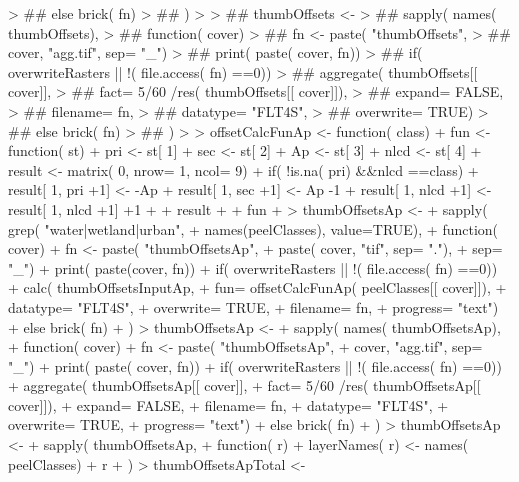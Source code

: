 \begin{Schunk}
\begin{Sinput}
{> ##            else brick( fn)
> ##          })
> 
> ## thumbOffsets <-
> ##   sapply( names( thumbOffsets),
> ##          function( cover) {
> ##            fn <- paste( "thumbOffsets",
> ##                        cover, "agg.tif", sep= "_")
> ##            print( paste( cover, fn))
> ##            if( overwriteRasters || !( file.access( fn) ==0))
> ##              aggregate( thumbOffsets[[ cover]],
> ##                        fact= 5/60 /res( thumbOffsets[[ cover]]),
> ##                        expand= FALSE,
> ##                        filename= fn,
> ##                        datatype= "FLT4S",
> ##                        overwrite= TRUE)
> ##            else brick( fn)
> ##          })
> 
> offsetCalcFunAp <- function( class) {
+   fun <- function( st) {
+     pri <- st[ 1]
+     sec <- st[ 2]
+     Ap <- st[ 3]
+     nlcd <- st[ 4]
+     result <- matrix( 0, nrow= 1, ncol= 9)
+     if( !is.na( pri) &&nlcd ==class) {
+       result[ 1, pri +1] <- -Ap
+       result[ 1, sec +1] <- Ap -1
+       result[ 1, nlcd +1] <- result[ 1, nlcd +1] +1
+     }
+     result
+   }
+   fun
+ }
> thumbOffsetsAp <-
+   sapply( grep( "water|wetland|urban",
+                names(peelClasses), value=TRUE),
+          function( cover) {
+            fn <- paste( "thumbOffsetsAp",
+                   paste( cover, "tif", sep= "."),
+                   sep= "_")
+            print( paste(cover, fn))
+            if( overwriteRasters || !( file.access( fn) ==0)) {
+              calc( thumbOffsetsInputAp,
+                   fun= offsetCalcFunAp( peelClasses[[ cover]]),
+                   datatype= "FLT4S",
+                   overwrite= TRUE,
+                   filename= fn,
+                   progress= "text")
+            } else brick( fn)
+          })
> thumbOffsetsAp <-
+   sapply( names( thumbOffsetsAp),
+          function( cover) {
+            fn <- paste( "thumbOffsetsAp",
+                        cover, "agg.tif", sep= "_")
+            print( paste( cover, fn))
+            if( overwriteRasters || !( file.access( fn) ==0))
+              aggregate( thumbOffsetsAp[[ cover]],
+                        fact= 5/60 /res( thumbOffsetsAp[[ cover]]),
+                        expand= FALSE,
+                        filename= fn,
+                        datatype= "FLT4S",
+                        overwrite= TRUE,
+                        progress= "text")
+            else brick( fn)
+          })
> thumbOffsetsAp <-
+   sapply( thumbOffsetsAp,
+          function( r) {
+            layerNames( r) <- names( peelClasses)
+            r
+          })
> thumbOffsetsApTotal <-

\end{Sinput}
\end{Schunk}
